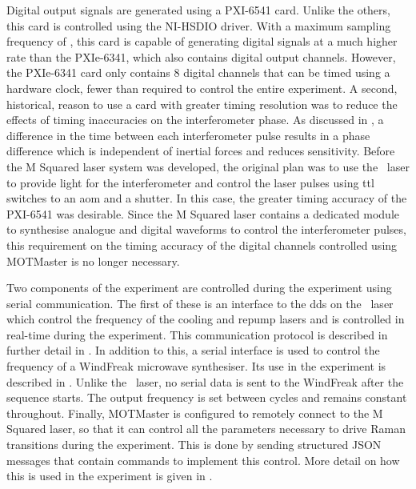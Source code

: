 Digital output signals are generated using a PXI-6541 card. Unlike the others, this card is controlled using the NI-HSDIO driver. With a maximum sampling frequency of , this card is capable of generating digital signals at a much higher rate than the PXIe-6341, which also contains digital output channels. However, the PXIe-6341 card only contains 8 digital channels that can be timed using a hardware clock, fewer than required to control the entire experiment. A second, historical, reason to use a card with greater timing resolution was to reduce the effects of timing inaccuracies on the interferometer phase. As discussed in , a difference in the time between each interferometer pulse results in a phase difference which is independent of inertial forces and reduces sensitivity. Before the M Squared laser system was developed, the original plan was to use the \Muquans\ laser to provide light for the interferometer and control the laser pulses using \ac{ttl} switches to an \ac{aom} and a shutter. In this case, the greater timing accuracy of the PXI-6541 was desirable. Since the M Squared laser contains a dedicated module to synthesise analogue and digital waveforms to control the interferometer pulses, this requirement on the timing accuracy of the digital channels controlled using MOTMaster is no longer necessary. \par\noindent
Two components of the experiment are controlled during the experiment using serial communication. The first of these is an interface to the \ac{dds} on the \Muquans\ laser which control the frequency of the cooling and repump lasers and is controlled in real-time during the experiment. This communication protocol is described in further detail in . In addition to this, a serial interface is used to control the frequency of a WindFreak microwave synthesiser. Its use in the experiment is described in . Unlike the \Muquans\ laser, no serial data is sent to the WindFreak after the sequence starts. The output frequency is set between cycles and remains constant throughout. Finally, MOTMaster is configured to remotely connect to the M Squared laser, so that it can control all the parameters necessary to drive Raman transitions during the experiment. This is done by sending structured JSON messages that contain commands to implement this control. More detail on how this is used in the experiment is given in .